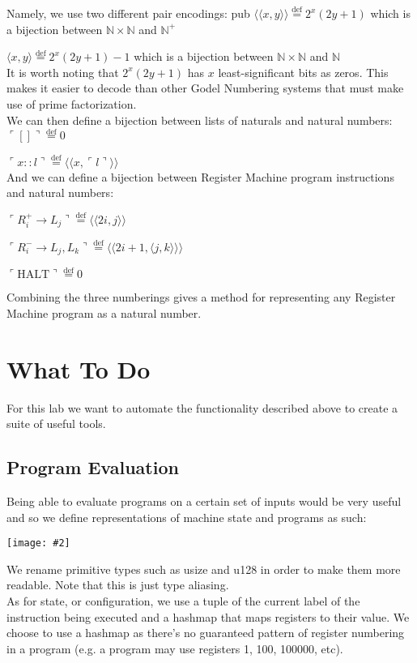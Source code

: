 \documentclass{report}
\newcommand{\centerimg}[2]{\begin{center}\texttt{[image: \#2]}\end{center}}
\newcommand*{\defeq}{\stackrel{\text{def}}{=}}
\begin{document}
Namely, we use two different pair encodings:
pub
$ \langle\langle x,y \rangle\rangle \defeq 2^x(2y+1) $ which is a bijection between $\mathbb{N} \times \mathbb{N}$ and $ \mathbb{N^+}$

$ \langle x,y \rangle \defeq 2^x(2y+1) - 1 $ which is a bijection between $\mathbb{N} \times \mathbb{N}$ and $ \mathbb{N}$\\

It is worth noting that $2^x(2y+1)$ has $x$ least-significant bits as zeros. 
This makes it easier to decode than other Godel Numbering systems that must 
make use of prime factorization.\\

We can then define a bijection between lists of naturals and natural numbers:
$ \ulcorner [] \urcorner \defeq 0$

$ \ulcorner x::l \urcorner \defeq \langle\langle x,\ulcorner l \urcorner \rangle\rangle$\\

And we can define a bijection between Register Machine program instructions and 
natural numbers:

$ \ulcorner R^+_i \to L_j \urcorner \defeq \langle\langle 2i,j \rangle\rangle$

$ \ulcorner R^-_i \to L_j,L_k \urcorner \defeq \langle\langle 2i+1,\langle j,k \rangle \rangle\rangle$

$ \ulcorner \text{HALT} \urcorner \defeq 0 $

Combining the three numberings gives a method for representing any Register Machine
program as a natural number.

\section*{What To Do}
For this lab we want to automate the functionality described above to create a
suite of useful tools.

\subsection*{Program Evaluation}
Being able to evaluate programs on a certain set of inputs would be very useful
and so we define representations of machine state and programs as such:
\centerimg{width=\textwidth}{ProgramTypes}
We rename primitive types such as usize and u128 in order to make them more readable.
Note that this is just type aliasing. \\


As for state, or configuration, we use a
tuple of the current label of the instruction being executed and a hashmap that
maps registers to their value. We choose to use a hashmap as there's no guaranteed
pattern of register numbering in a program (e.g. a program may use registers 1, 100, 100000, etc).\\
\end{document}

